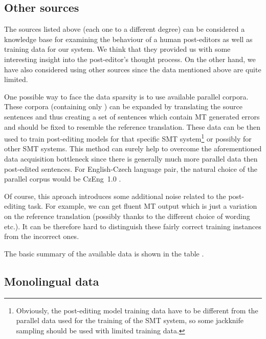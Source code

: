 \subsection{Other sources}

The sources listed above (each one to a different degree) can
be considered a knowledge base for examining the behaviour of a human post-editors as well
as training data for our system. We think that they provided us with
some interesting insight into the post-editor's thought process. On the other hand,
we have also considered using other sources since the data mentioned above are quite
limited.

One possible way to face the data sparsity is to use available parallel corpora.
These corpora (containing only )
can be expanded by translating the source sentences and thus creating a set of 
sentences which contain MT generated errors and should be fixed to resemble the 
reference translation. These data can be then used to train post-editing models for that
specific SMT system\footnote{Obviously, the post-editing model training data have to be
different from the parallel data used for the training of the SMT system, so
some
jackknife sampling should be used with limited training data.} or possibly for
other SMT systems.
This method can surely help to overcome the aforementioned data acquisition bottleneck
since there is generally much more parallel data then post-edited sentences. For
English-Czech language pair, the natural choice of the parallel corpus would be
CzEng~1.0 \citep{czeng10:lrec2012}.


Of course, this aproach introduces some additional noise
related to the post-editing task. For example, we can get fluent MT output which
is just a variation on the reference translation (possibly thanks to the different
choice of wording etc.). It can be therefore hard to distinguish these fairly correct training
instances from the incorrect ones.

The basic summary of the available data is shown in the table .

\subsection{Monolingual data}

